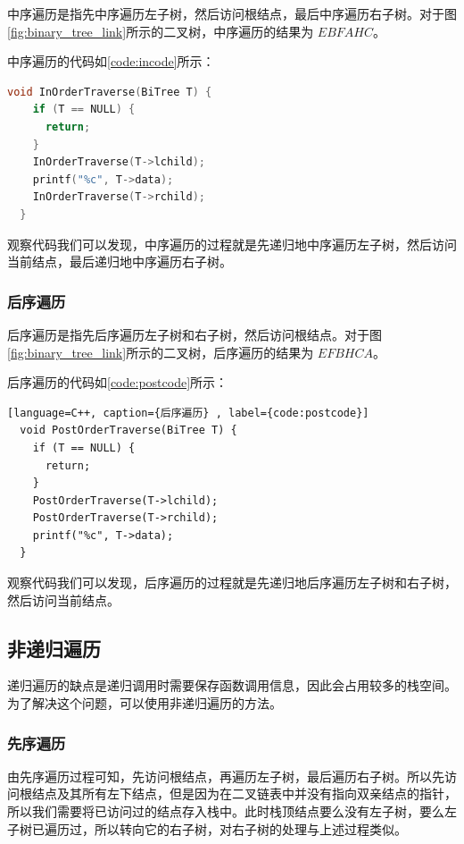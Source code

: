 \documentclass[lang=cn,newtx,10pt,scheme=chinese]{../elegantbook}
\begin{document}
中序遍历是指先中序遍历左子树，然后访问根结点，最后中序遍历右子树。对于图\ref{fig:binary_tree_link}所示的二叉树，中序遍历的结果为 $EBFAHC$。

中序遍历的代码如\ref{code:incode}所示：

\begin{lstlisting}[language=C++, caption={中序遍历}, label={code:incode}]
  void InOrderTraverse(BiTree T) {
    if (T == NULL) {
      return;
    }
    InOrderTraverse(T->lchild);
    printf("%c", T->data);
    InOrderTraverse(T->rchild);
  }

\end{lstlisting}

观察代码我们可以发现，中序遍历的过程就是先递归地中序遍历左子树，然后访问当前结点，最后递归地中序遍历右子树。
\subsubsection{后序遍历}


后序遍历是指先后序遍历左子树和右子树，然后访问根结点。对于图\ref{fig:binary_tree_link}所示的二叉树，后序遍历的结果为 $EFBHCA$。

后序遍历的代码如\ref{code:postcode}所示：

\begin{lstlisting}[language=C++, caption={后序遍历} , label={code:postcode}]
  void PostOrderTraverse(BiTree T) {
    if (T == NULL) {
      return;
    }
    PostOrderTraverse(T->lchild);
    PostOrderTraverse(T->rchild);
    printf("%c", T->data);
  }

\end{lstlisting}

观察代码我们可以发现，后序遍历的过程就是先递归地后序遍历左子树和右子树，然后访问当前结点。
\subsection{非递归遍历}

递归遍历的缺点是递归调用时需要保存函数调用信息，因此会占用较多的栈空间。为了解决这个问题，可以使用非递归遍历的方法。


\subsubsection{先序遍历}

由先序遍历过程可知，先访问根结点，再遍历左子树，最后遍历右子树。所以先访问根结点及其所有左下结点，但是因为在二叉链表中并没有指向双亲结点的指针，
所以我们需要将已访问过的结点存入栈中。此时栈顶结点要么没有左子树，要么左子树已遍历过，所以转向它的右子树，对右子树的处理与上述过程类似。
\end{document}
